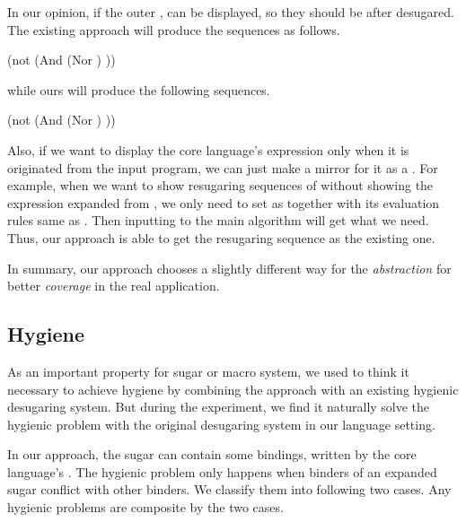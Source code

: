 In our opinion, if the outer ,  can be displayed, so they should be after desugared.
The existing approach will produce the sequences as follows.
\begin{footnotesize}
\begin{Codes}
	\qquad(not (And (Nor \false \true) \true))
\OneStep{ \true}
\end{Codes}
\end{footnotesize}
while ours will produce the following sequences.
\begin{footnotesize}
\begin{Codes}
	\qquad(not (And (Nor \false \true) \true))
\OneStep{ \true}
\end{Codes}
\end{footnotesize}

Also, if we want to display the core language's expression only when it is originated from the input program, we can just make a mirror for it as a . For example, when we want to show resugaring sequences of 
without showing the  expression expanded from , we only need to set  as  together with its evaluation rules same as . Then inputting  to the main algorithm will get what we need. Thus, our approach is able to get the resugaring sequence as the existing one.

In summary, our approach chooses a slightly different way for the \emph{abstraction} for better \emph{coverage} in the real application.
\subsection{Hygiene}
\label{mark:hygiene}

As an important property for sugar or macro system, we used to think it necessary to achieve hygiene by combining the approach with an existing hygienic desugaring system. But during the experiment, we find it naturally solve the hygienic problem with the original desugaring system in our language setting.

In our approach, the sugar can contain some bindings, written by the core language's . The hygienic problem only happens when binders of an expanded sugar conflict with other binders. We classify them into following two cases. Any hygienic problems are composite by the two cases.

